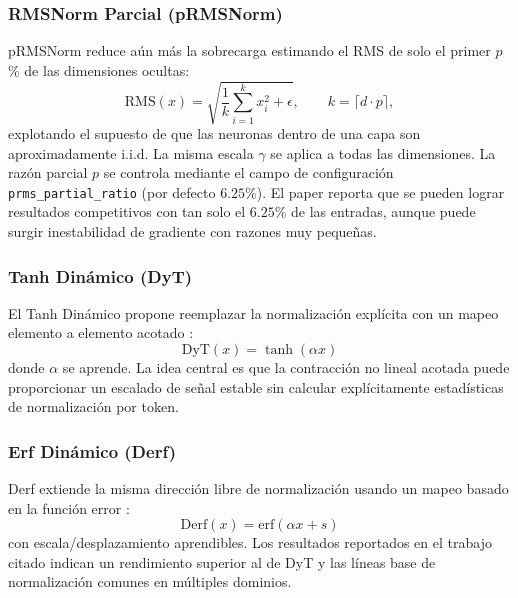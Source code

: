 \subsubsection{RMSNorm Parcial (pRMSNorm)}
pRMSNorm \citep{zhang_root_2019} reduce aún más la sobrecarga estimando el RMS de solo el primer $p$\% de las dimensiones ocultas:
\[
\mathrm{RMS}(x)=\sqrt{\frac{1}{k}\sum_{i=1}^{k}x_i^2+\epsilon},\qquad k=\lceil d\cdot p\rceil,
\]
explotando el supuesto de que las neuronas dentro de una capa son aproximadamente i.i.d. La misma escala $\gamma$ se aplica a todas las dimensiones. La razón parcial $p$ se controla mediante el campo de configuración \texttt{prms\_partial\_ratio} (por defecto $6.25\%$). El paper reporta que se pueden lograr resultados competitivos con tan solo el $6.25\%$ de las entradas, aunque puede surgir inestabilidad de gradiente con razones muy pequeñas.

\subsubsection{Tanh Dinámico (DyT)}
El Tanh Dinámico propone reemplazar la normalización explícita con un mapeo elemento a elemento acotado \citep{zhu_transformers_2025}:
\[
\mathrm{DyT}(x)=\tanh(\alpha x)
\]
donde $\alpha$ se aprende. La idea central es que la contracción no lineal acotada puede proporcionar un escalado de señal estable sin calcular explícitamente estadísticas de normalización por token.

\subsubsection{Erf Dinámico (Derf)}
Derf extiende la misma dirección libre de normalización usando un mapeo basado en la función error \citep{chen_stronger_2025}:
\[
\mathrm{Derf}(x)=\mathrm{erf}(\alpha x+s)
\]
con escala/desplazamiento aprendibles. Los resultados reportados en el trabajo citado indican un rendimiento superior al de DyT y las líneas base de normalización comunes en múltiples dominios.

